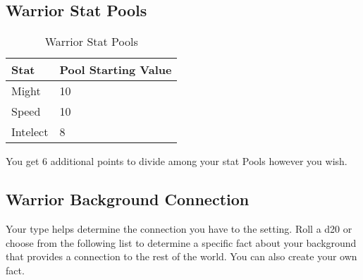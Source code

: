 \subsection{Warrior Stat Pools}

\begin{table}[H]
\centering
\caption{Warrior Stat Pools}
\label{tab: Warrior Stat Pools}

\begin{tabularx}{\linewidth}{| X | X |}
\hline
\textbf{Stat} & \textbf{Pool Starting Value} \\
\hline
Might & 10 \\ \hline
Speed & 10 \\ \hline
Intelect & 8  \\ \hline

\end{tabularx}

\end{table}

\raggedright

You get 6 additional points to divide among your stat Pools however you wish.

\subsection{Warrior Background Connection}

Your type helps determine the connection you have to the setting. Roll a d20 or choose from the following list to determine a specific fact about your background that provides a connection to the rest of the world. You can also create your own fact.

